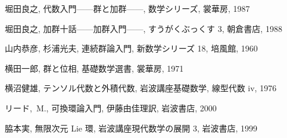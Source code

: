 \documentclass[12pt,twoside]{jarticle}
\begin{document}
\begin{thebibliography}{ABCD}
堀田良之, 代数入門——群と加群——, 数学シリーズ, 裳華房, 1987

堀田良之, 加群十話——加群入門——, すうがくぶっくす 3, 朝倉書店, 1988

山内恭彦, 杉浦光夫, 連続群論入門, 新数学シリーズ 18, 培風館, 1960

横田一郎, 群と位相, 基礎数学選書, 裳華房, 1971

横沼健雄, テンソル代数と外積代数, 岩波講座基礎数学, 線型代数 iv, 1976

リード,~M., 可換環論入門, 伊藤由佳理訳, 岩波書店, 2000

脇本実, 無限次元 Lie 環, 岩波講座現代数学の展開 3, 岩波書店, 1999

\end{thebibliography}

\end{document}
